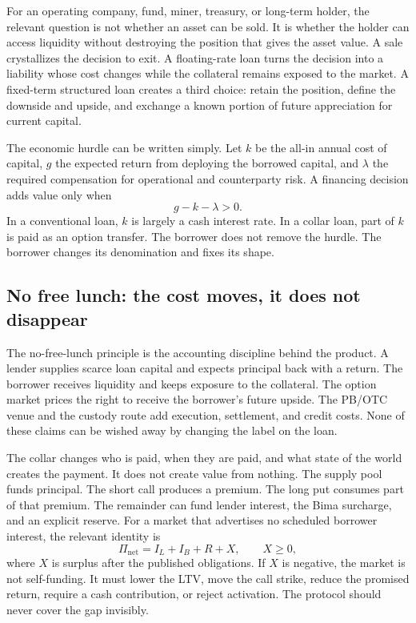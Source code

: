 \documentclass[11pt,oneside]{article}
\begin{document}
For an operating company, fund, miner, treasury, or long-term holder, the relevant question is not whether an asset can be sold. It is whether the holder can access liquidity without destroying the position that gives the asset value. A sale crystallizes the decision to exit. A floating-rate loan turns the decision into a liability whose cost changes while the collateral remains exposed to the market. A fixed-term structured loan creates a third choice: retain the position, define the downside and upside, and exchange a known portion of future appreciation for current capital.

The economic hurdle can be written simply. Let $k$ be the all-in annual cost of capital, $g$ the expected return from deploying the borrowed capital, and $\lambda$ the required compensation for operational and counterparty risk. A financing decision adds value only when
\[
g-k-\lambda>0.
\]
In a conventional loan, $k$ is largely a cash interest rate. In a collar loan, part of $k$ is paid as an option transfer. The borrower does not remove the hurdle. The borrower changes its denomination and fixes its shape.

\subsection{No free lunch: the cost moves, it does not disappear}

The no-free-lunch principle is the accounting discipline behind the product. A
lender supplies scarce loan capital and expects principal back with a return.
The borrower receives liquidity and keeps exposure to the collateral. The
option market prices the right to receive the borrower's future upside. The
PB/OTC venue and the custody route add execution, settlement, and credit costs.
None of these claims can be wished away by changing the label on the loan.

The collar changes who is paid, when they are paid, and what state of the world
creates the payment. It does not create value from nothing. The supply pool
funds principal. The short call produces a premium. The long put consumes part
of that premium. The remainder can fund lender interest, the Bima surcharge,
and an explicit reserve. For a market that advertises no scheduled borrower
interest, the relevant identity is
\[
\Pi_{\mathrm{net}}=I_L+I_B+R+X,
\qquad X\geq 0,
\]
where $X$ is surplus after the published obligations. If $X$ is negative, the
market is not self-funding. It must lower the LTV, move the call strike,
reduce the promised return, require a cash contribution, or reject activation.
The protocol should never cover the gap invisibly.
\end{document}
